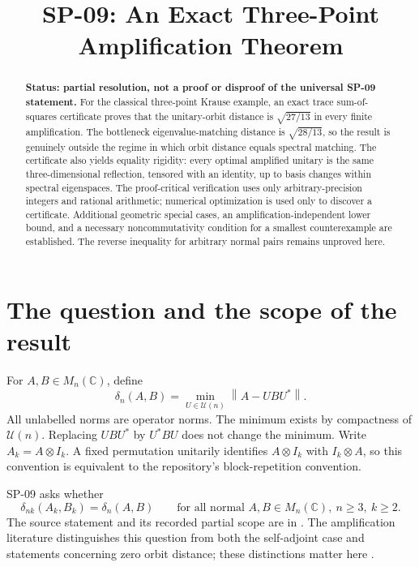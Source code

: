 \documentclass[11pt]{article}
\title{SP-09: An Exact Three-Point\\Amplification Theorem}
\author{}
\date{}
\theoremstyle{definition}\newtheorem{definition}[theorem]{Definition}
\theoremstyle{remark}\newtheorem{remark}[theorem]{Remark}
\newcommand{\C}{\mathbb C}
\newcommand{\U}{\mathcal U}
\newcommand{\norm}[1]{\left\lVert#1\right\rVert}
\newcommand{\dd}{\delta}
\begin{document}
\maketitle
\vspace{-1.4em}
\begin{abstract}
\noindent\textbf{Status: partial resolution, not a proof or disproof of the universal SP-09 statement.}
For the classical three-point Krause example, an exact trace sum-of-squares certificate proves that the unitary-orbit distance is $\sqrt{27/13}$ in every finite amplification. The bottleneck eigenvalue-matching distance is $\sqrt{28/13}$, so the result is genuinely outside the regime in which orbit distance equals spectral matching. The certificate also yields equality rigidity: every optimal amplified unitary is the same three-dimensional reflection, tensored with an identity, up to basis changes within spectral eigenspaces. The proof-critical verification uses only arbitrary-precision integers and rational arithmetic; numerical optimization is used only to discover a certificate. Additional geometric special cases, an amplification-independent lower bound, and a necessary noncommutativity condition for a smallest counterexample are established. The reverse inequality for arbitrary normal pairs remains unproved here.
\end{abstract}

\section{The question and the scope of the result}
For $A,B\in M_n(\C)$, define
\[
 \dd_n(A,B)=\min_{U\in\U(n)}\norm{A-UBU^*}.
\]
All unlabelled norms are operator norms. The minimum exists by compactness of $\U(n)$. Replacing $UBU^*$ by $U^*BU$ does not change the minimum. Write $A_k=A\otimes I_k$. A fixed permutation unitarily identifies $A\otimes I_k$ with $I_k\otimes A$, so this convention is equivalent to the repository's block-repetition convention.

SP-09 asks whether
\begin{equation}\label{eq:target}
 \dd_{nk}(A_k,B_k)=\dd_n(A,B)
 \qquad\text{for all normal }A,B\in M_n(\C),\ n\ge3,\ k\ge2.
\end{equation}
The source statement and its recorded partial scope are in \cite{repo}. The amplification literature distinguishes this question from both the self-adjoint case and statements concerning zero orbit distance; these distinctions matter here \cite{msz}.
\end{document}
